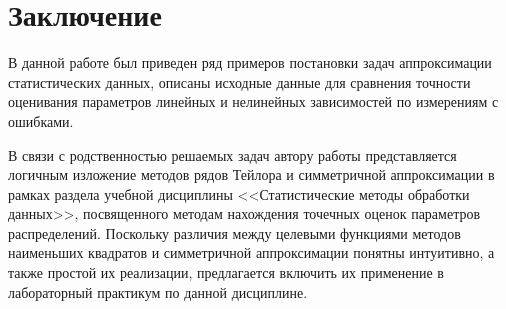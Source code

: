 \chapter*{Заключение}

В данной работе был приведен ряд примеров постановки задач
аппроксимации статистических данных,
описаны исходные данные для сравнения точности оценивания параметров
линейных и нелинейных зависимостей по измерениям с ошибками.

В связи с родственностью решаемых задач автору работы представляется логичным
изложение методов рядов Тейлора и симметричной аппроксимации в
рамках раздела учебной дисциплины <<Статистические методы обработки данных>>,
посвященного методам нахождения точечных оценок параметров распределений.
Поскольку различия между целевыми функциями методов наименьших квадратов и
симметричной аппроксимации понятны интуитивно, а также простой их реализации,
предлагается включить их применение в лабораторный практикум по данной дисциплине.